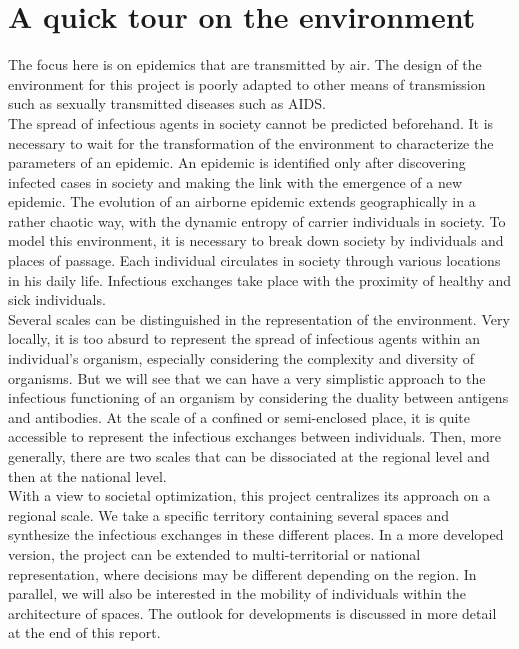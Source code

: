 \newpage

\section*{A quick tour on the environment}

The focus here is on epidemics that are transmitted by air. The design of the environment for this project is poorly adapted to other means of transmission such as sexually transmitted diseases such as AIDS.\\

The spread of infectious agents in society cannot be predicted beforehand. It is necessary to wait for the transformation of the environment to characterize the parameters of an epidemic. An epidemic is identified only after discovering infected cases in society and making the link with the emergence of a new epidemic. The evolution of an airborne epidemic extends geographically in a rather chaotic way, with the dynamic entropy of carrier individuals in society. To model this environment, it is necessary to break down society by individuals and places of passage. Each individual circulates in society through various locations in his daily life. Infectious exchanges take place with the proximity of healthy and sick individuals.\\

Several scales can be distinguished in the representation of the environment. Very locally, it is too absurd to represent the spread of infectious agents within an individual's organism, especially considering the complexity and diversity of organisms. But we will see that we can have a very simplistic approach to the infectious functioning of an organism by considering the duality between antigens and antibodies. At the scale of a confined or semi-enclosed place, it is quite accessible to represent the infectious exchanges between individuals. Then, more generally, there are two scales that can be dissociated at the regional level and then at the national level.\\

With a view to societal optimization, this project centralizes its approach on a regional scale. We take a specific territory containing several spaces and synthesize the infectious exchanges in these different places. In a more developed version, the project can be extended to multi-territorial or national representation, where decisions may be different depending on the region. In parallel, we will also be interested in the mobility of individuals within the architecture of spaces. The outlook for developments is discussed in more detail at the end of this report.\\

